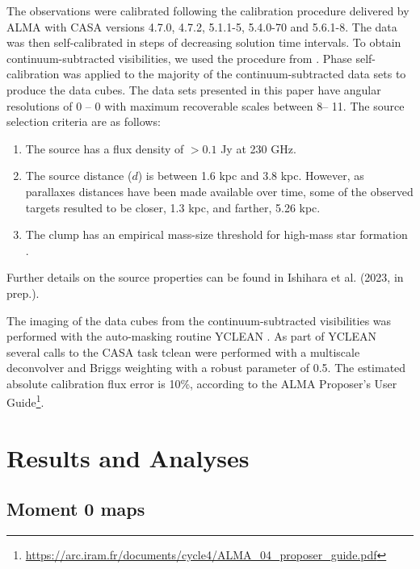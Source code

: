\documentclass[twocolumn, twocolappendix]{aastex631}
\begin{document}
The observations were calibrated following the calibration procedure delivered by ALMA with CASA \citep{2022PASP..134k4501C} versions 4.7.0, 4.7.2, 5.1.1-5, 5.4.0-70 and 5.6.1-8.
The data was then self-calibrated in steps of decreasing solution time intervals.
To obtain continuum-subtracted visibilities, we used the procedure from \citet{2021ApJ...909..199O}.
Phase self-calibration was applied to the majority of the continuum-subtracted data sets to produce the data cubes.
The data sets presented in this paper have angular resolutions of 0 -- 0 with maximum recoverable scales between 8\arcsec -- 11\arcsec.
The source selection criteria are as follows:
\begin{enumerate}
\item The source has a flux density of $>0.1$ Jy at 230 GHz. 
\item The source distance ($d$) is between 1.6 kpc and 3.8 kpc. However, as parallaxes distances have been made available over time, some of the observed targets resulted to be closer, 1.3 kpc, and farther, 5.26 kpc.
\item The clump has an empirical mass-size threshold for high-mass star formation \citep[$M>580$ M$_{\odot}$ ($r$/pc)$^{1.33}$;][]{2010ApJ...723L...7K,2017ApJ...841...97S}.
\end{enumerate}
Further details on the source properties can be found in Ishihara et al. (2023, in prep.).

The imaging of the data cubes from the continuum-subtracted visibilities was performed with the auto-masking routine YCLEAN \citep{2018zndo...1216881C,2018ApJ...861...14C}.
As part of YCLEAN several calls to the CASA task tclean were performed with a multiscale deconvolver and Briggs weighting with a robust parameter of 0.5.
The estimated absolute calibration flux error is 10\%, according to the ALMA Proposer's User Guide\footnote{\url{https://arc.iram.fr/documents/cycle4/ALMA_04_proposer_guide.pdf}}.



\section{Results and Analyses} \label{sec:res}

\subsection{Moment 0 maps} \label{sec:mom0}
\end{document}
